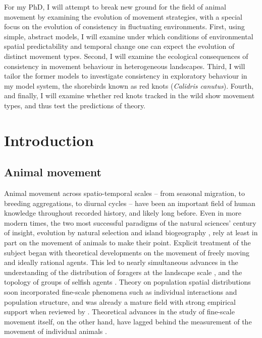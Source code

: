 For my PhD, I will attempt to break new ground for the field of animal movement by examining the evolution of movement strategies, with a special focus on the evolution of consistency in fluctuating environments. First, using simple, abstract models, I will examine under which conditions of environmental spatial predictability and temporal change one can expect the evolution of distinct movement types. Second, I will examine the ecological consequences of consistency in movement behaviour in heterogeneous landscapes. Third, I will tailor the former models to investigate consistency in exploratory behaviour in my model system, the shorebirds known as red knots (\emph{Calidris canutus}). Fourth, and finally, I will examine whether red knots tracked in the wild show movement types, and thus test the predictions of theory.

\newpage

\chapter{Introduction}

\section{Animal movement}

Animal movement across spatio-temporal scales -- from seasonal migration, to breeding aggregations, to diurnal cycles -- have been an important field of human knowledge throughout recorded history, and likely long before.
Even in more modern times, the two most successful paradigms of the natural sciences' century of insight, evolution by natural selection \citep{darwin1858} and island biogeography \citep{macarthur2001}, rely at least in part on the movement of animals to make their point.
Explicit treatment of the subject began with theoretical developments on the movement of freely moving and ideally rational agents. This led to nearly simultaneous advances in the understanding of the distribution of foragers at the landscape scale \citep{fretwell1970}, and the topology of groups of selfish agents \citep{hamilton1971}.
Theory on population spatial distributions soon incorporated fine-scale phenomena such as individual interactions and population structure, and was already a mature field with strong empirical support when reviewed by \citet{sutherland1996}.
Theoretical advances in the study of fine-scale movement itself, on the other hand, have lagged behind the measurement of the movement of individual animals \citep{holyoak2008}.

